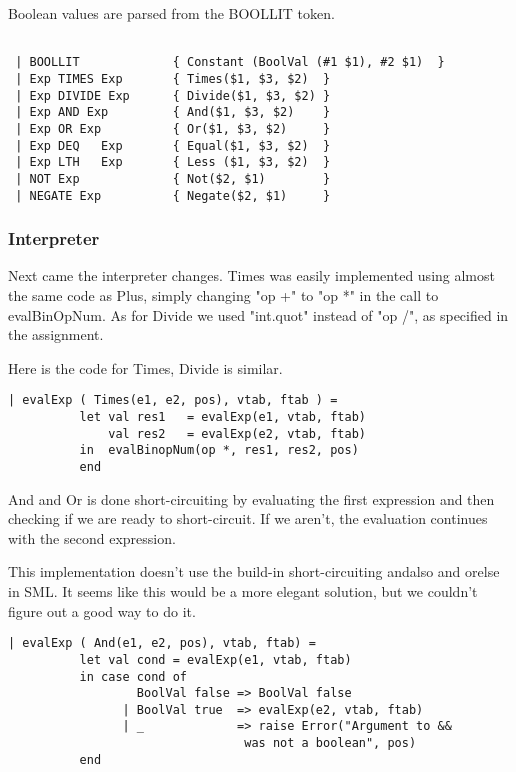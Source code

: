 \documentclass[10pt]{article}
\begin{document}
Boolean values are parsed from the BOOLLIT token.

\begin{Verbatim}[frame=single]

 | BOOLLIT             { Constant (BoolVal (#1 $1), #2 $1)  }
 | Exp TIMES Exp       { Times($1, $3, $2)  }
 | Exp DIVIDE Exp      { Divide($1, $3, $2) }
 | Exp AND Exp         { And($1, $3, $2)    }
 | Exp OR Exp          { Or($1, $3, $2)     }
 | Exp DEQ   Exp       { Equal($1, $3, $2)  }
 | Exp LTH   Exp       { Less ($1, $3, $2)  }
 | NOT Exp             { Not($2, $1)        }
 | NEGATE Exp          { Negate($2, $1)     }
\end{Verbatim}

\subsubsection{Interpreter}
Next came the interpreter changes. Times was easily implemented using almost the same code as Plus, simply changing "op +" to "op *" in the call to evalBinOpNum. As for Divide we used "int.quot" instead of "op /", as specified in the assignment.

Here is the code for Times, Divide is similar.

\begin{Verbatim}[frame=single]
    | evalExp ( Times(e1, e2, pos), vtab, ftab ) =
          let val res1   = evalExp(e1, vtab, ftab)
              val res2   = evalExp(e2, vtab, ftab)
          in  evalBinopNum(op *, res1, res2, pos)
          end
\end{Verbatim}

And and Or is done short-circuiting by evaluating the first expression and then checking if we are ready to short-circuit. If we aren't, the evaluation continues with the second expression.

This implementation doesn't use the build-in short-circuiting andalso and orelse in SML. It seems like this would be a more elegant solution, but we couldn't figure out a good way to do it.

\begin{Verbatim}[frame=single]
    | evalExp ( And(e1, e2, pos), vtab, ftab) =
          let val cond = evalExp(e1, vtab, ftab)
          in case cond of
                  BoolVal false => BoolVal false
                | BoolVal true  => evalExp(e2, vtab, ftab)
                | _             => raise Error("Argument to && 
                                 was not a boolean", pos)
          end
\end{Verbatim}
\end{document}
